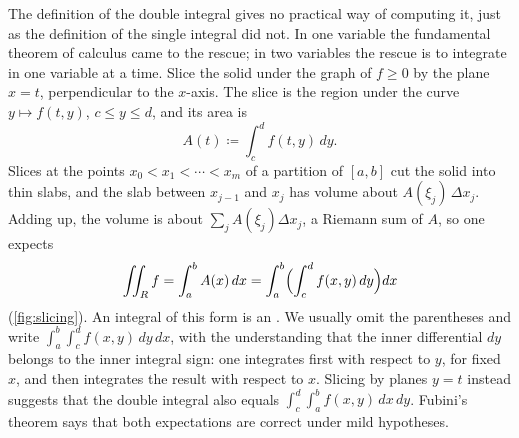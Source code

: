 The definition of the double integral gives no practical way of computing it, just as the definition of the single integral did not. In one variable the fundamental theorem of calculus came to the rescue; in two variables the rescue is to integrate in one variable at a time. Slice the solid under the graph of $f\ge0$ by the plane $x=t$, perpendicular to the $x$-axis. The slice is the region under the curve $y\mapsto f(t,y)$, $c\le y\le d$, and its area is
\[
A(t)\coloneqq\int_c^df(t,y)\,dy .
\]
Slices at the points $x_0<x_1<\cdots<x_m$ of a partition of $[a,b]$ cut the solid into thin slabs, and the slab between $x_{j-1}$ and $x_j$ has volume about $A(\xi_j)\,\Delta x_j$. Adding up, the volume is about $\sum_jA(\xi_j)\Delta x_j$, a Riemann sum of $A$, so one expects
\[
\iint_Rf=\int_a^bA(x)\,dx=\int_a^b\Bigl(\int_c^df(x,y)\,dy\Bigr)dx
\]
(\cref{fig:slicing}). An integral of this form is an . We usually omit the parentheses and write $\int_a^b\int_c^df(x,y)\,dy\,dx$, with the understanding that the inner differential $dy$ belongs to the inner integral sign: one integrates first with respect to $y$, for fixed $x$, and then integrates the result with respect to $x$. Slicing by planes $y=t$ instead suggests that the double integral also equals $\int_c^d\int_a^bf(x,y)\,dx\,dy$. Fubini's theorem says that both expectations are correct under mild hypotheses.


